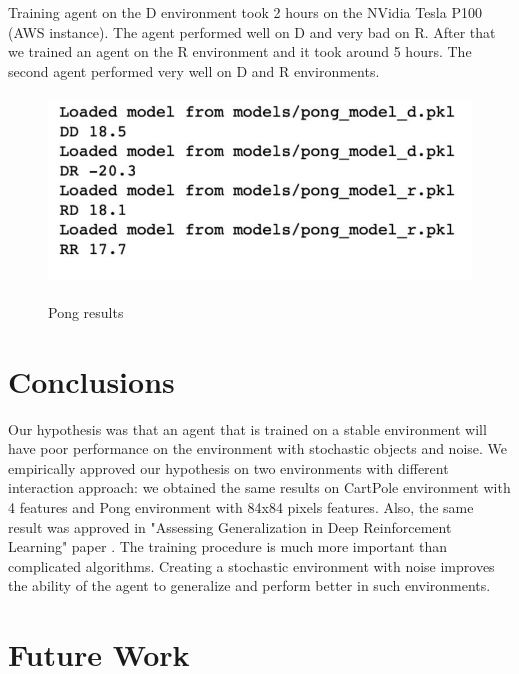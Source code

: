 Training agent on the D environment took 2 hours on the NVidia Tesla P100 (AWS instance). The agent performed well on D and very bad on R. After that we trained an agent on the R environment and it took around 5 hours. The second agent performed very well on D and R environments.

\begin{figure}[H]
\centering
\includegraphics[height=5cm]{Pong_results.png}\\[0.5cm] 
\caption{Pong results}
\end{figure}

\section{Conclusions}

Our hypothesis was that an agent that is trained on a stable environment will have poor performance on the environment with stochastic objects and noise. We empirically approved our hypothesis on two environments with different interaction approach: we obtained the same results on CartPole environment with 4 features and Pong environment with 84x84 pixels features. Also, the same result was approved in "Assessing Generalization in Deep Reinforcement Learning" paper \cite{GeneralizationPaper}. The training procedure is much more important than complicated algorithms. Creating a stochastic environment with noise improves the ability of the agent to generalize and perform better in such environments.

\section{Future Work}

